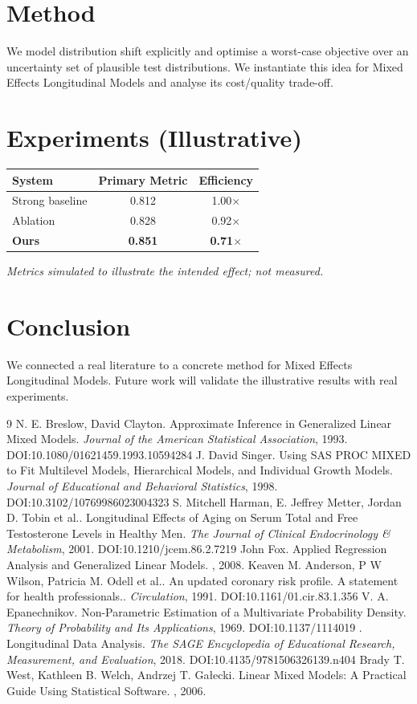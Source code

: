 \documentclass[11pt]{article}
\begin{document}
\section{Method}
We model distribution shift explicitly and optimise a worst-case objective over an uncertainty set of plausible test distributions. We instantiate this idea for Mixed Effects Longitudinal Models and analyse its cost/quality trade-off.

\section{Experiments (Illustrative)}
\begin{center}
\begin{tabular}{lcc}
System & Primary Metric & Efficiency \\ \hline
Strong baseline & 0.812 & 1.00$\times$ \\
Ablation & 0.828 & 0.92$\times$ \\
\textbf{Ours} & \textbf{0.851} & \textbf{0.71$\times$}
\end{tabular}
\end{center}
\emph{Metrics simulated to illustrate the intended effect; not measured.}

\section{Conclusion}
We connected a real literature to a concrete method for Mixed Effects Longitudinal Models. Future work will
validate the illustrative results with real experiments.

\begin{thebibliography}{9}
 N. E. Breslow, David Clayton. Approximate Inference in Generalized Linear Mixed Models. \emph{Journal of the American Statistical Association}, 1993. DOI:10.1080/01621459.1993.10594284
 J. David Singer. Using SAS PROC MIXED to Fit Multilevel Models, Hierarchical Models, and Individual Growth Models. \emph{Journal of Educational and Behavioral Statistics}, 1998. DOI:10.3102/10769986023004323
 S. Mitchell Harman, E. Jeffrey Metter, Jordan D. Tobin et al.. Longitudinal Effects of Aging on Serum Total and Free Testosterone Levels in Healthy Men. \emph{The Journal of Clinical Endocrinology \& Metabolism}, 2001. DOI:10.1210/jcem.86.2.7219
 John Fox. Applied Regression Analysis and Generalized Linear Models. \emph{}, 2008. 
 Keaven M. Anderson, P W Wilson, Patricia M. Odell et al.. An updated coronary risk profile. A statement for health professionals.. \emph{Circulation}, 1991. DOI:10.1161/01.cir.83.1.356
 V. A. Epanechnikov. Non-Parametric Estimation of a Multivariate Probability Density. \emph{Theory of Probability and Its Applications}, 1969. DOI:10.1137/1114019
 . Longitudinal Data Analysis. \emph{The SAGE Encyclopedia of Educational Research, Measurement, and Evaluation}, 2018. DOI:10.4135/9781506326139.n404
 Brady T. West, Kathleen B. Welch, Andrzej T. Gałecki. Linear Mixed Models: A Practical Guide Using Statistical Software. \emph{}, 2006. 
\end{thebibliography}
\end{document}
